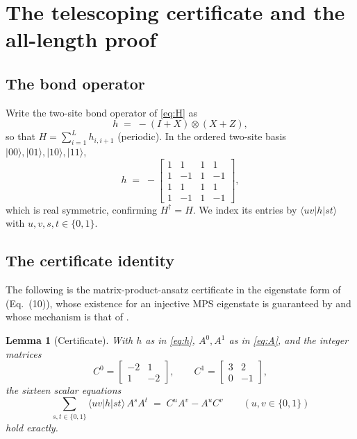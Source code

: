 \documentclass[11pt]{amsart}
\newcommand{\ket}[1]{\lvert #1 \rangle}
\newcommand{\bra}[1]{\langle #1 \rvert}
\theoremstyle{plain}
\newtheorem{lemma}[theorem]{Lemma}
\theoremstyle{definition}
\theoremstyle{remark}
\begin{document}
\section{The telescoping certificate and the all-length
proof}\label{sec:cert}

\subsection{The bond operator}\label{ssec:bond}
Write the two-site bond operator of \eqref{eq:H} as
\begin{equation}\label{eq:h}
h \;=\; -(I+X)\otimes(X+Z),
\end{equation}
so that $H=\sum_{i=1}^{L}h_{i,i+1}$ (periodic). In the ordered two-site
basis $\ket{00},\ket{01},\ket{10},\ket{11}$,
\[
h \;=\;
-\begin{bmatrix}
1&1&1&1\\ 1&-1&1&-1\\ 1&1&1&1\\ 1&-1&1&-1
\end{bmatrix},
\]
which is real symmetric, confirming $H^\dagger=H$. We index its entries by
$\bra{uv}h\ket{st}$ with $u,v,s,t\in\{0,1\}$.

\subsection{The certificate identity}\label{ssec:certid}
The following is the matrix-product-ansatz certificate in the eigenstate
form of \cite{GE26} (Eq.~(10)), whose existence for an injective MPS
eigenstate is guaranteed by \cite{GRMSV26} and whose mechanism is that of
\cite{DEHP93}.

\begin{lemma}[Certificate]\label{lem:cert}
With $h$ as in \eqref{eq:h}, $A^0,A^1$ as in \eqref{eq:A}, and the integer
matrices
\begin{equation}\label{eq:C}
C^0=\begin{bmatrix}-2&1\\1&-2\end{bmatrix},
\qquad
C^1=\begin{bmatrix}3&2\\0&-1\end{bmatrix},
\end{equation}
the sixteen scalar equations
\begin{equation}\label{eq:certid}
\sum_{s,t\in\{0,1\}} \bra{uv}h\ket{st}\,A^{s}A^{t}
\;=\; C^{u}A^{v}-A^{u}C^{v}
\qquad (u,v\in\{0,1\})
\end{equation}
hold exactly.
\end{lemma}
\end{document}
